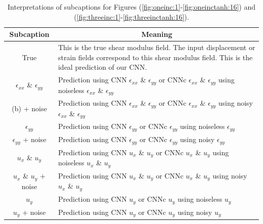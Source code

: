 \documentclass[12pt]{article}
\begin{document}
%
\begin{table}
  \centering
   \begin{tabular}{cp{8cm}}
    \hline
    \multicolumn{1}{|c|}{Subcaption} & \multicolumn{1}{c|}{Meaning}\\
    \hline
    \multicolumn{1}{|c|}{True} & \multicolumn{1}{p{8cm}|}{This is the true shear modulus field. The input displacement or strain fields correspond to this shear modulus field. This is the ideal prediction of our CNN.}\\
    \hline
    \multicolumn{1}{|c|}{$\epsilon_{xx}$ \& $\epsilon_{yy}$} & \multicolumn{1}{p{8cm}|}{Prediction using CNN $\epsilon_{xx}$ \& $\epsilon_{yy}$ or CNNc $\epsilon_{xx}$ \& $\epsilon_{yy}$ using noiseless $\epsilon_{xx}$ \& $\epsilon_{yy}$}\\
    \hline
    \multicolumn{1}{|c|}{(b) + noise} & \multicolumn{1}{p{8cm}|}{Prediction using CNN $\epsilon_{xx}$ \& $\epsilon_{yy}$ or CNNc $\epsilon_{xx}$ \& $\epsilon_{yy}$ using noisy $\epsilon_{xx}$ \& $\epsilon_{yy}$}\\
    \hline
    \multicolumn{1}{|c|}{$\epsilon_{yy}$} & \multicolumn{1}{p{8cm}|}{Prediction using CNN $\epsilon_{yy}$ or CNNc $\epsilon_{yy}$ using noiseless $\epsilon_{yy}$}\\
    \hline
    \multicolumn{1}{|c|}{$\epsilon_{yy}$ + noise} & \multicolumn{1}{p{8cm}|}{Prediction using CNN $\epsilon_{yy}$ or CNNc $\epsilon_{yy}$ using noisy $\epsilon_{yy}$}\\
    \hline
    \multicolumn{1}{|c|}{$u_x$ \& $u_y$} & \multicolumn{1}{p{8cm}|}{Prediction using CNN $u_x$ \& $u_y$ or CNNc $u_x$ \& $u_y$ using noiseless $u_x$ \& $u_y$ }\\
    \hline
    \multicolumn{1}{|c|}{$u_x$ \& $u_y$ + noise} & \multicolumn{1}{p{8cm}|}{Prediction using CNN $u_x$ \& $u_y$ or CNNc $u_x$ \& $u_y$ using noisy $u_x$ \& $u_y$ }\\
    \hline
    \multicolumn{1}{|c|}{$u_y$} & \multicolumn{1}{p{8cm}|}{Prediction using CNN $u_y$ or CNNc $u_y$ using noiseless $u_y$ }\\
    \hline
    \multicolumn{1}{|c|}{$u_y$ + noise} & \multicolumn{1}{p{8cm}|}{Prediction using CNN $u_y$ or CNNc $u_y$ using noisy $u_y$ }\\
    \hline
  \end{tabular}
  \caption{\label{tab:subcap} Interpretations of subcaptions for Figures (\ref{fig:oneinc:1}-\ref{fig:oneinctanh:16}) and (\ref{fig:threeinc:1}-\ref{fig:threeinctanh:16}).}
\end{table}
\end{document}
